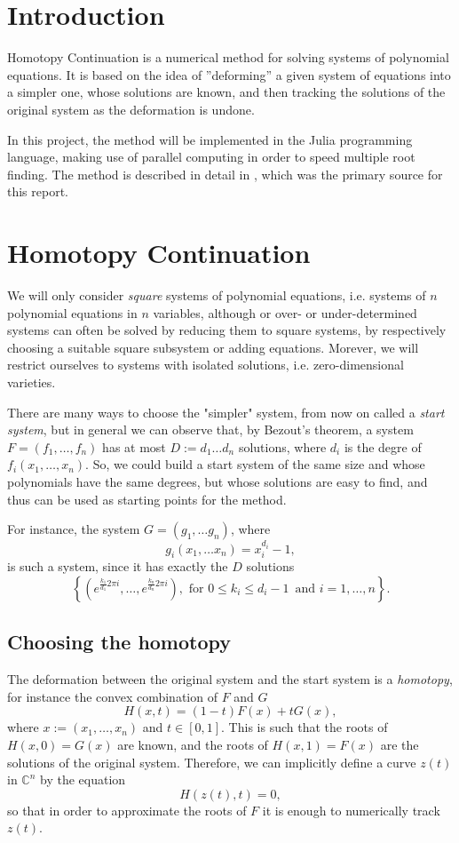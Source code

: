 \documentclass[a4paper]{article}
\newcommand{\C}{\mathbb{C}}
\theoremstyle{definition}
\theoremstyle{definition}
\theoremstyle{remark}
\theoremstyle{definition}
\begin{document}
\tableofcontents
\newpage

\section{Introduction}
Homotopy Continuation is a numerical method for solving systems of polynomial equations.
It is based on the idea of ”deforming” a given system of equations into a simpler one, whose
solutions are known, and then tracking the solutions of the original system as the deformation
is undone.

In this project, the method will be implemented in the Julia programming language, making use
of parallel computing in order to speed multiple root finding. The method is described in detail
in \cite{BertiniBook}, which was the primary source for this report.

\section{Homotopy Continuation}
We will only consider \textit{square} systems of polynomial equations, i.e. systems of $n$ polynomial equations in $n$ variables, although or over- or under-determined systems can
often be solved by reducing them to square systems, by respectively choosing a suitable square subsystem or adding equations. Morever, we will restrict ourselves to systems with
isolated solutions, i.e. zero-dimensional varieties.

There are many ways to choose the "simpler" system, from now on called a \textit{start system}, but in general we can observe that, by Bezout's theorem, a system
$F=(f_1,\ldots,f_n)$ has at most $D:=d_1\ldots d_n$ solutions, where $d_i$ is the degre of $f_i(x_1,\ldots,x_n)$. So, we could build a start system of the same size and whose
polynomials have the same degrees, but whose solutions are easy to find, and thus can be used as starting points for the method.

For instance, the system $G=(g_1,\ldots g_n)$, where
$$ g_i(x_1,\ldots x_n)=x_i^{d_i}-1 ,$$
is such a system, since it has exactly the $D$ solutions
$$ \left\{\left(e^{\frac{k_1}{d_1}2\pi i},\ldots,e^{\frac{k_n}{d_n}2\pi i}\right),\text{ for }0\leq k_i\leq d_i-1\,\text{ and }i=1,\ldots,n\right\} .$$
\subsection{Choosing the homotopy}
The deformation between the original system and the start system is a \textit{homotopy}, for instance the convex combination of $F$ and $G$
\begin{equation}\label{eq:h1} H(x,t)=(1-t)F(x)+tG(x) ,\end{equation}
where $x:=(x_1,\ldots,x_n)$ and $t\in[0,1].$ This is such that the roots of $H(x,0)=G(x)$ are known, and the roots of $H(x,1)=F(x)$ are the solutions of the original system. Therefore, we can implicitly
define a curve $z(t)$ in $\C^n$ by the equation \begin{equation}\label{eq:h2} H(z(t),t)=0,\end{equation} so that in order to approximate the roots of $F$ it is enough to numerically track $z(t)$.
\end{document}
